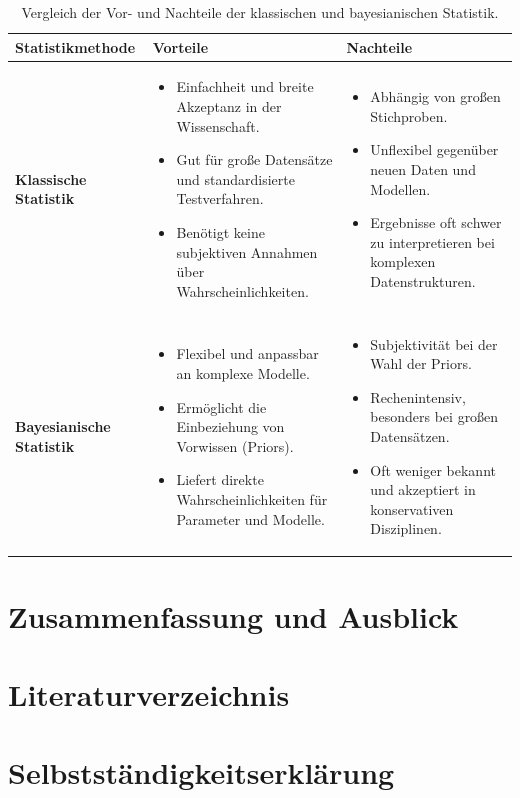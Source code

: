 \documentclass[a4paper,12pt]{article}
\begin{document}
\begin{table}[h!]
  \centering
  \begin{tabular}{|p{4cm}|p{5cm}|p{5cm}|}
  \hline
  \textbf{Statistikmethode} & \textbf{Vorteile} & \textbf{Nachteile} \\ \hline
  \textbf{Klassische Statistik} & 
  \begin{itemize}
      \item Einfachheit und breite Akzeptanz in der Wissenschaft.
      \item Gut für große Datensätze und standardisierte Testverfahren.
      \item Benötigt keine subjektiven Annahmen über Wahrscheinlichkeiten.
  \end{itemize} & 
  \begin{itemize}
      \item Abhängig von großen Stichproben.
      \item Unflexibel gegenüber neuen Daten und Modellen.
      \item Ergebnisse oft schwer zu interpretieren bei komplexen Datenstrukturen.
  \end{itemize} \\ \hline
  \textbf{Bayesianische Statistik} & 
  \begin{itemize}
      \item Flexibel und anpassbar an komplexe Modelle.
      \item Ermöglicht die Einbeziehung von Vorwissen (Priors).
      \item Liefert direkte Wahrscheinlichkeiten für Parameter und Modelle.
  \end{itemize} & 
  \begin{itemize}
      \item Subjektivität bei der Wahl der Priors.
      \item Rechenintensiv, besonders bei großen Datensätzen.
      \item Oft weniger bekannt und akzeptiert in konservativen Disziplinen.
  \end{itemize} \\ \hline
  \end{tabular}
  \caption{Vergleich der Vor- und Nachteile der klassischen und bayesianischen Statistik.}
  \label{tab:vergleich_vor_nachteile}
\end{table}

\newpage

\section{Zusammenfassung und Ausblick}

\newpage

\section{Literaturverzeichnis} 

\printbibliography 
\newpage

\section{Selbstständigkeitserklärung}
\end{document}
